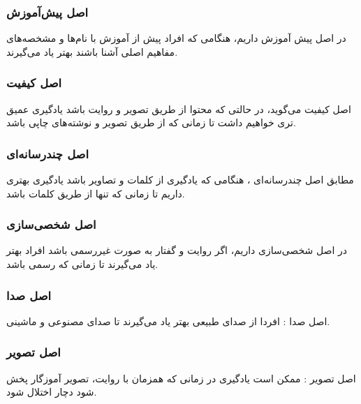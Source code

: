 \subsubsection{اصل پیش‌آموزش}
در اصل پیش آموزش
داریم،‌ هنگامی که افراد پیش از آموزش با نام‌ها و مشخصه‌های مفاهیم اصلی آشنا باشند بهتر یاد می‌گیرند.
\subsubsection{اصل کیفیت}
اصل کیفیت
می‌گوید، در حالتی که محتوا از طریق تصویر و روایت باشد یادگیری عمیق تری خواهیم داشت تا زمانی که از طریق تصویر و نوشته‌های چاپی باشد.
\subsubsection{اصل چندرسانه‌ای}
مطابق اصل چندرسانه‌ای
، هنگامی که یادگیری از کلمات و تصاویر باشد یادگیری بهتری داریم تا زمانی که تنها از طریق کلمات باشد.
\subsubsection{اصل شخصی‌سازی}
در اصل شخصی‌سازی
داریم، اگر روایت و گفتار به صورت غیررسمی باشد افراد بهتر یاد می‌گیرند تا زمانی که رسمی باشد.
\subsubsection{اصل صدا}
اصل صدا
:
افردا از صدای طبیعی بهتر یاد می‌گیرند تا صدای مصنوعی و ماشینی.
\subsubsection{اصل تصویر}
اصل تصویر
:
ممکن است یادگیری در زمانی که همزمان با روایت، تصویر آموزگار پخش شود دچار اختلال شود.